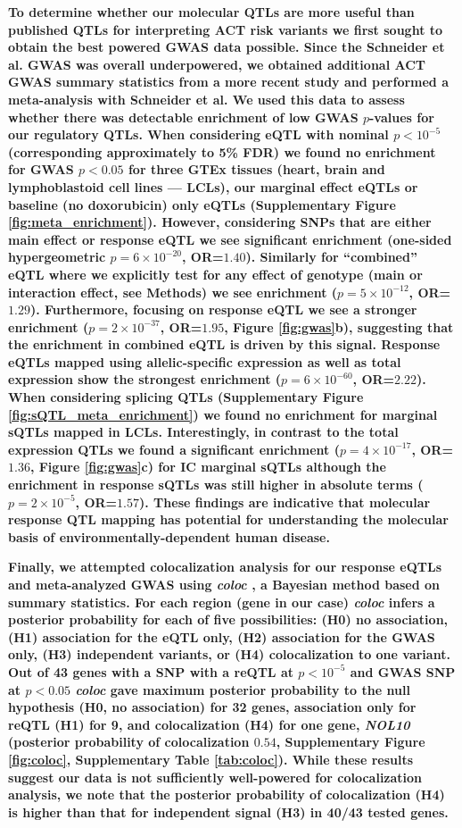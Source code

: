 \documentclass{article}
\newcommand{\tempbold}[1]{\textbf{#1}}
\begin{document}
\tempbold{To determine whether our molecular QTLs are more useful than published QTLs for interpreting ACT risk variants we first sought to obtain the best powered GWAS data possible. Since the Schneider et al. GWAS was overall underpowered, we obtained additional ACT GWAS summary statistics from a more recent study\cite{Serie2017} and performed a meta-analysis with Schneider et al. We used this data to assess whether there was detectable enrichment of low GWAS $p$-values for our regulatory QTLs. When considering eQTL with nominal $p < 10^{-5}$ (corresponding approximately to 5\% FDR) we found no enrichment for GWAS $p<0.05$ for three GTEx tissues (heart, brain and lymphoblastoid cell lines --- LCLs), our marginal effect eQTLs or baseline (no doxorubicin) only eQTLs (Supplementary Figure \ref{fig:meta_enrichment}). However, considering SNPs that are either main effect or response eQTL we see significant enrichment (one-sided hypergeometric $p=6 \times 10^{-20}$, OR=$1.40$). Similarly for ``combined'' eQTL where we explicitly test for any effect of genotype  (main or interaction effect, see Methods) we see enrichment ($p=5 \times 10^{-12}$, OR=$1.29$). Furthermore, focusing on response eQTL we see a stronger enrichment ($p=2 \times 10^{-37}$, OR=$1.95$, Figure \ref{fig:gwas}b), suggesting that the enrichment in combined eQTL is driven by this signal. Response eQTLs mapped using allelic-specific expression as well as total expression show the strongest enrichment ($p=6 \times 10^{-60}$, OR=$2.22$). When considering splicing QTLs (Supplementary Figure \ref{fig:sQTL_meta_enrichment}) we found no enrichment for marginal sQTLs mapped in LCLs\cite{li2016rna}. Interestingly, in contrast to the total expression QTLs we found a significant enrichment ($p=4 \times 10^{-17}$, OR=$1.36$, Figure \ref{fig:gwas}c) for IC marginal sQTLs although the enrichment in response sQTLs was still higher in absolute terms ($p=2 \times 10^{-5}$, OR=$1.57$). These findings are indicative that molecular response QTL mapping has potential for understanding the molecular basis of environmentally-dependent human disease.}

\tempbold{Finally, we attempted colocalization analysis for our response eQTLs and meta-analyzed GWAS using \emph{coloc} \cite{Giambartolomei2014-ux}, a Bayesian method based on summary statistics. For each region (gene in our case) \emph{coloc} infers a posterior probability for each of five possibilities: (H0) no association, (H1) association for the eQTL only, (H2) association for the GWAS only, (H3) independent variants, or (H4) colocalization to one variant. Out of 43 genes with a SNP with a reQTL at $p<10^{-5}$ and GWAS SNP at $p<0.05$ \emph{coloc} gave maximum posterior probability to the null hypothesis (H0, no association) for 32 genes, association only for reQTL (H1) for 9, and colocalization (H4) for one gene, \emph{NOL10} (posterior probability of colocalization $0.54$, Supplementary Figure \ref{fig:coloc}, Supplementary Table \ref{tab:coloc}). While these results suggest our data is not sufficiently well-powered for colocalization analysis, we note that the posterior probability of colocalization (H4) is higher than that for independent signal (H3) in 40/43 tested genes.}
\end{document}
